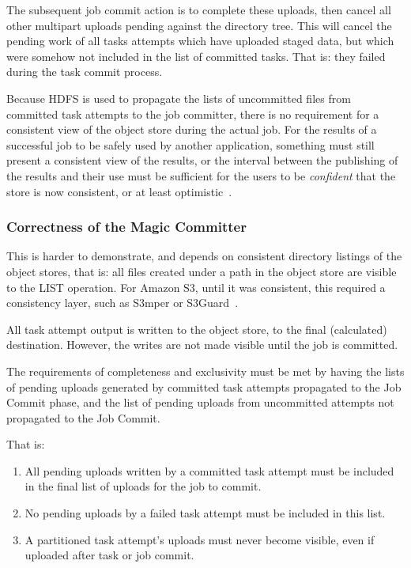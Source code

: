 \documentclass[conference]{IEEEtran}
\begin{document}
The subsequent job commit action is to complete these uploads,
then cancel all other multipart uploads pending against the directory tree.
This will cancel the pending work of all tasks attempts which have uploaded staged
data, but which were somehow not included in the list of committed tasks.
That is: they failed during the task commit process.

Because HDFS is used to propagate the lists of uncommitted files from
committed task attempts to the job committer, there is no requirement for
a consistent view of the object store during the actual job.
For the results of a successful job to be safely used by another application,
something must still present a consistent view of the results, or
the interval between the publishing of the results and their use must be sufficient
for the users to be \emph{confident} that the store is now consistent,
or at least optimistic\ \cite{Bermbach:2014:BEC:2624303.2624662}.



\subsubsection{Correctness of the Magic Committer}

This is harder to demonstrate, and depends on consistent directory
listings of the object stores, that is: all files created under a path
in the object store are visible to the LIST operation.
For Amazon S3, until it was consistent, this required a consistency layer,
such as S3mper or S3Guard\ \cite{S3mper,HADOOP-13345}.

All task attempt output is written to the object store, to the final (calculated)
destination.
However, the writes are not made visible until the job is committed.

The requirements of completeness and exclusivity must be met by
having the lists of pending uploads generated by committed task attempts propagated
to the Job Commit phase, and the list of pending uploads from uncommitted
attempts not propagated to the Job Commit.

That is:

\begin{enumerate}
  \item All pending uploads written by a committed task attempt must be
  included in the final list of uploads for the job to commit.
  \item No pending uploads by a failed task attempt must be included in this list.
  \item A partitioned task attempt's uploads must never become visible,
  even if uploaded after task or job commit.
\end{enumerate}
\end{document}
